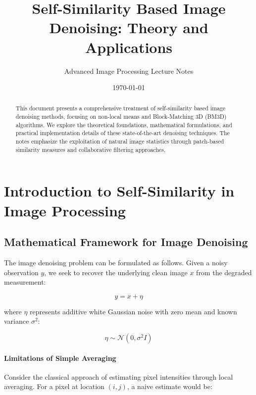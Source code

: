 \documentclass[12pt]{article}
\title{\textbf{Self-Similarity Based Image Denoising: Theory and Applications}}
\author{Advanced Image Processing Lecture Notes}
\date{\today}
\begin{document}
\maketitle

\begin{abstract}
    This document presents a comprehensive treatment of self-similarity based image denoising methods, focusing on non-local means and Block-Matching 3D (BM3D) algorithms. We explore the theoretical foundations, mathematical formulations, and practical implementation details of these state-of-the-art denoising techniques. The notes emphasize the exploitation of natural image statistics through patch-based similarity measures and collaborative filtering approaches.
\end{abstract}

\tableofcontents

\newpage

\section{Introduction to Self-Similarity in Image Processing}
\label{sec:introduction}

\subsection{Mathematical Framework for Image Denoising}
\label{subsec:framework}

The image denoising problem can be formulated as follows. Given a noisy observation $y$, we seek to recover the underlying clean image $x$ from the degraded measurement:

\begin{equation}
    \label{eq:observation_model}
    y = x + \eta
\end{equation}

where $\eta$ represents additive white Gaussian noise with zero mean and known variance $\sigma^2$:

\begin{equation}
    \label{eq:noise_model}
    \eta \sim \mathcal{N}(0, \sigma^2 I)
\end{equation}

\paragraph{Limitations of Simple Averaging}
Consider the classical approach of estimating pixel intensities through local averaging. For a pixel at location $(i,j)$, a naive estimate would be:
\end{document}
